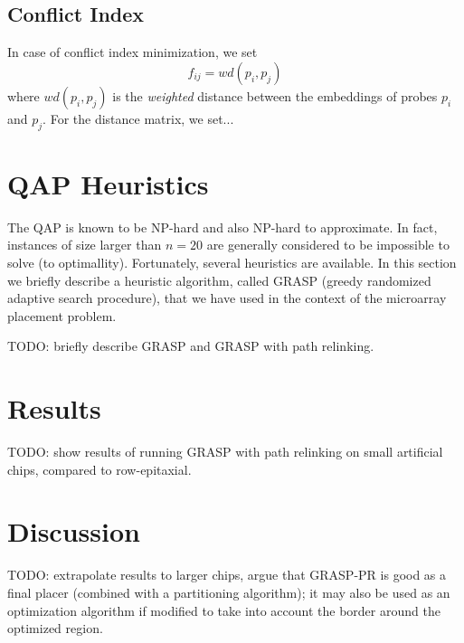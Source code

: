 \documentclass{bioinfo}
\begin{document}
\subsection{Conflict Index}

In case of conflict index minimization, we set
\begin{equation}
f_{ij} = wd(p_i, p_j)
\end{equation}
where $wd(p_i, p_j)$ is the \emph{weighted} distance between the embeddings of probes $p_i$ and $p_j$. For the distance matrix, we set...

\section{QAP Heuristics}

The QAP is known to be NP-hard and also NP-hard to approximate. In fact, instances of size larger than $n = 20$ are generally considered to be impossible to solve (to optimallity). Fortunately, several heuristics are available. In this section we briefly describe a heuristic algorithm, called GRASP (greedy randomized adaptive search procedure), that we have used in the context of the microarray placement problem.

TODO: briefly describe GRASP and GRASP with path relinking.

\section{Results}

TODO: show results of running GRASP with path relinking on small artificial chips, compared to row-epitaxial.

\section{Discussion}

TODO: extrapolate results to larger chips, argue that GRASP-PR is good as a final placer (combined with a partitioning algorithm); it may also be used as an optimization algorithm if modified to take into account the border around the optimized region.
\end{document}
